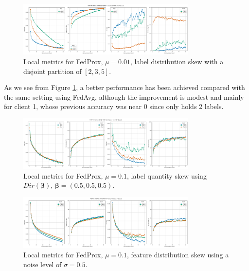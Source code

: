 \begin{figure}[H]
  \centering
  \includegraphics[width=0.8\textwidth]{figures/2-Federated_Learning/FedProx_LabelsPerParty_mu_0.01.png}
  \caption{Local metrics for FedProx, $\mu = 0.01$, label distribution skew with a disjoint partition of $[2,3,5]$.}
  \label{fig:FedProx_LabelsPerParty_Mu_0.01}
\end{figure}

As we see from Figure \ref{fig:FedProx_LabelsPerParty_Mu_0.01}, a better performance has been achieved compared with the same setting using FedAvg, although the improvement is modest and mainly for client 1, whose previous accuracy was near 0 since only holds 2 labels. 

\begin{figure}[H]
  \centering
  \includegraphics[width=0.8\textwidth]{figures/2-Federated_Learning/FedProx_QuantitySkew_Dir_05_Mu_0.1.png}
  \caption{Local metrics for FedProx, $\mu = 0.1$, label quantity skew using $Dir(\boldsymbol{\beta})$, $\boldsymbol{\beta} = (0.5,0.5,0.5)$.}
  \label{fig:FedProx_LabelsQuantitySkew_Dir_05_Mu_0.1}
\end{figure}

\begin{figure}[H]
  \centering
  \includegraphics[width=0.8\textwidth]{figures/2-Federated_Learning/FedProx_NoiseLevel_Mu_0.1.png}
  \caption{Local metrics for FedProx, $\mu = 0.1$, feature distribution skew using a noise level of $\sigma = 0.5$.}
  \label{fig:FedProx_Noise_Dir_05_Mu_0.1}
\end{figure}

